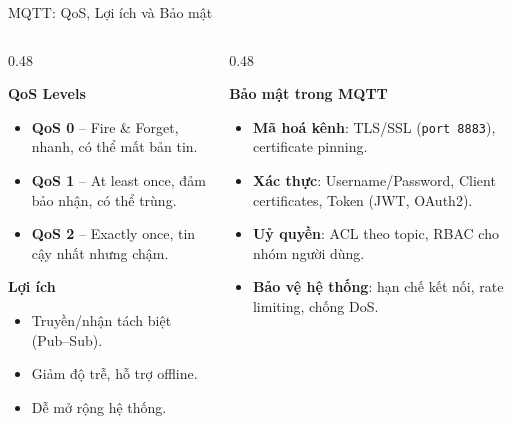 \begin{frame}{MQTT: QoS, Lợi ích và Bảo mật}
\small
\begin{columns}[T,totalwidth=\textwidth]
    \begin{column}{0.48\textwidth}
        \begin{block}{\textbf{QoS Levels}}
            \begin{itemize}
                \item \textcolor{green!60!black}{\textbf{QoS 0}} – Fire \& Forget, nhanh, có thể mất bản tin.
                \item \textcolor{orange!80!black}{\textbf{QoS 1}} – At least once, đảm bảo nhận, có thể trùng.
                \item \textcolor{red!70!black}{\textbf{QoS 2}} – Exactly once, tin cậy nhất nhưng chậm.
            \end{itemize}
        \end{block}

        \begin{block}{\textbf{Lợi ích}}
            \begin{itemize}
                \item Truyền/nhận tách biệt (Pub–Sub).
                \item Giảm độ trễ, hỗ trợ offline.
                \item Dễ mở rộng hệ thống.
            \end{itemize}
        \end{block}
    \end{column}

    \begin{column}{0.48\textwidth}
        \begin{block}{\textbf{Bảo mật trong MQTT}}
            \begin{itemize}
                \item \textbf{Mã hoá kênh}: TLS/SSL (\texttt{port 8883}), certificate pinning.
                \item \textbf{Xác thực}: Username/Password, Client certificates, Token (JWT, OAuth2).
                \item \textbf{Uỷ quyền}: ACL theo topic, RBAC cho nhóm người dùng.
                \item \textbf{Bảo vệ hệ thống}: hạn chế kết nối, rate limiting, chống DoS.
            \end{itemize}
        \end{block}
    \end{column}
\end{columns}
\end{frame}

